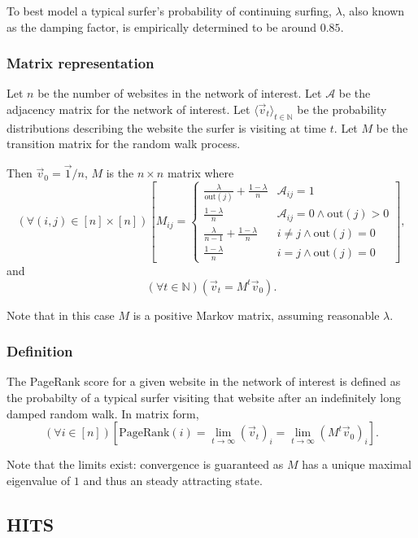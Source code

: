 \documentclass[12pt, titlepage, twoside]{amsart}
\newcommand{\N}{\ensuremath{\mathbb N}}
\begin{document}
To best model a typical surfer's probability of continuing surfing, $\lambda$, also known as the damping factor,
is empirically determined to be around $0.85$.

\subsubsection{Matrix representation}

Let $n$ be the number of websites in the network of interest.
Let $\mathcal{A}$ be the adjacency matrix for the network of interest.
Let $\langle\vec{v}_{t}\rangle_{t\in\N}$ be the probability distributions describing the
website the surfer is visiting at time $t$.
Let $M$ be the transition matrix for the random walk process.

Then $\vec{v}_0 = \vec{1} / n$,
$M$ is the $n\times n$ matrix where
\[
  (\forall (i, j)\in[n]\times[n])
  \left[
  M_{ij} =
  \begin{cases}
    \frac{\lambda}{\mathrm{out}(j)} + \frac{1 - \lambda}{n}
    & \mathcal{A}_{ij} = 1 \\
    \frac{1 - \lambda}{n}
    & \mathcal{A}_{ij} = 0\wedge\mathrm{out}(j) > 0 \\
    \frac{\lambda}{n - 1} + \frac{1 - \lambda}{n}
    & i \neq j\wedge\mathrm{out}(j) = 0 \\
    \frac{1 - \lambda}{n}
    & i = j\wedge\mathrm{out}(j) = 0
  \end{cases}
  \right],
\]
and
\[
  (\forall t\in\N)\left(\vec{v}_t = M^t\vec{v}_0\right).
\]

Note that in this case $M$ is a positive Markov matrix, assuming reasonable $\lambda$.

\subsubsection{Definition}

The PageRank score for a given website in the network of interest is defined as the probabilty of a typical surfer
visiting that website after an indefinitely long damped random walk.
In matrix form,
\[
  (\forall i\in[n])
  \left[\mathrm{PageRank}(i) = \lim_{t\to\infty}(\vec{v}_t)_i = \lim_{t\to\infty}\left(M^t\vec{v}_0\right)_i\right].
\]

Note that the limits exist: convergence is guaranteed as $M$ has a unique maximal eigenvalue of $1$ and thus an steady
attracting state.

\subsection{HITS}
\end{document}

